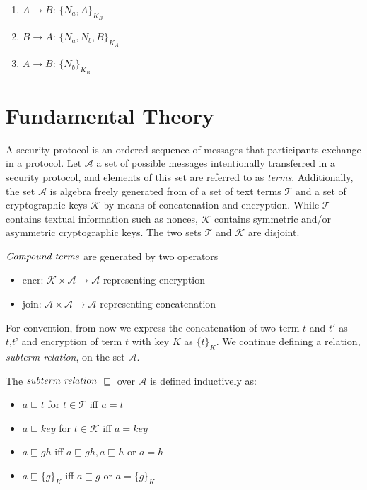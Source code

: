 \begin{enumerate}
\item $A \rightarrow B$: $\{N_a, A\}_{K_B}$
\item $B \rightarrow A$: $\{N_a,N_b, B\}_{K_A}$
\item $A \rightarrow B$: $\{N_b\}_{K_B}$
\end{enumerate}

\section{Fundamental Theory}

A security protocol is an ordered sequence of messages that participants exchange in a protocol. Let $\mathcal{A}$ a set of possible messages intentionally transferred in a security protocol, and elements of this set are referred to as \textit{terms}. Additionally, the set $\mathcal{A}$ is algebra freely generated from of a set of text terms $\mathcal{T}$ and a set of cryptographic keys $\mathcal{K}$ by means of concatenation and encryption. While $\mathcal{T}$ contains textual information such as nonces, $\mathcal{K}$ contains symmetric and/or asymmetric cryptographic keys. The two sets $\mathcal{T}$ and $\mathcal{K}$ are disjoint. 

\begin{Definition} $\emph{Compound terms}$ are generated by two operators
\begin{itemize}
	\item encr: $\mathcal{K} \times \mathcal{A} \rightarrow \mathcal{A}$ representing encryption
	\item join: $\mathcal{A} \times \mathcal{A} \rightarrow \mathcal{A}$ representing concatenation
\end{itemize}
\end{Definition}

For convention, from now we express the concatenation of two term $t$ and $t'$ as $\textit{t,t'}$ and encryption of term $t$ with key $K$ as $\{t\}_K$. We continue defining a relation, \textit{subterm relation}, on the set $\mathcal{A}$. 

\begin{Definition} The $\emph{subterm relation}$ $\sqsubseteq$ over $\mathcal{A}$ is defined inductively as: 
	\begin{itemize}
		\item $a \sqsubseteq t $ for $t \in \mathcal{T}$   iff $a = t $
		\item $a \sqsubseteq key $ for $t \in \mathcal{K}$   iff $a = key $
		\item $a \sqsubseteq gh $ iff $a \sqsubseteq gh, a \sqsubseteq h $ or $ a= h $
		\item $a \sqsubseteq \{g\}_K $ iff $a \sqsubseteq g $ or $a = \{g\}_K$
	\end{itemize} 
\end{Definition}

